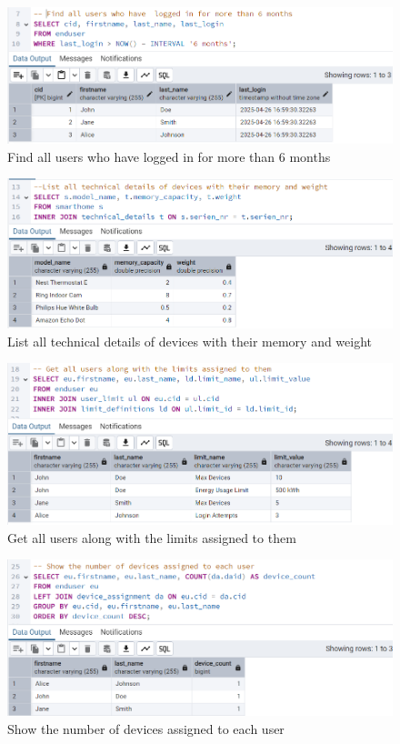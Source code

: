 \documentclass{article}
\begin{document}
\begin{figure}[H]
\centering
\includegraphics[width=\linewidth]{img/q2.png}
\caption{Find all users who have logged in for more than 6 months}
\end{figure}


\begin{figure}[H]
\centering
\includegraphics[width=\linewidth]{img/q3.png}
\caption{List all technical details of devices with their memory and weight}
\end{figure}

\begin{figure}[H]
\centering
\includegraphics[width=\linewidth]{img/q4.png}
\caption{Get all users along with the limits assigned to them}
\end{figure}

\begin{figure}[H]
\centering
\includegraphics[width=\linewidth]{img/q5.png}
\caption{Show the number of devices assigned to each user}
\end{figure}
\end{document}
